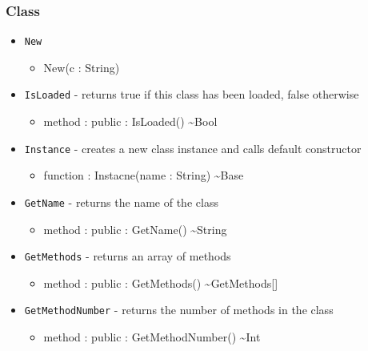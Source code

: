 \documentclass[11pt]{article}
\begin{document}
\subsubsection{Class}
\begin{itemize}
\item \texttt{New}
  \begin{itemize}
  \item New(c : String)
  \end{itemize}
\item \texttt{IsLoaded} - returns true if this class has been loaded,
  false otherwise
  \begin{itemize}
  \item method : public : IsLoaded() \textasciitilde Bool
  \end{itemize}
\item \texttt{Instance} - creates a new class instance and calls default constructor
  \begin{itemize}
  \item function : Instacne(name : String) \textasciitilde Base
  \end{itemize}
\item \texttt{GetName} - returns the name of the class
  \begin{itemize}
  \item method : public : GetName() \textasciitilde String
  \end{itemize}
\item \texttt{GetMethods} - returns an array of methods
  \begin{itemize}
  \item method : public : GetMethods() \textasciitilde GetMethods[]
  \end{itemize}
\item \texttt{GetMethodNumber} - returns the number of methods in the class
  \begin{itemize}
  \item method : public : GetMethodNumber() \textasciitilde Int
  \end{itemize}
\end{itemize}
\end{document}
